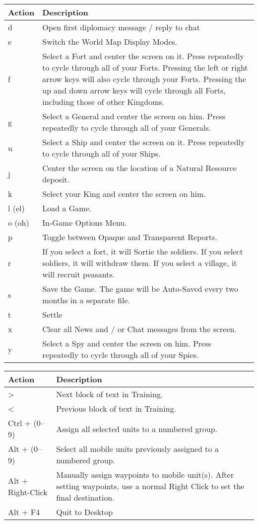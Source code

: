 \begin{tabular}{ | l | p{10cm} |}
	\hline	 	
	Action	& Description \\ \hline
	d	& Open first diplomacy message / reply to chat \\ \hline
	e	& Switch the World Map Display Modes. \\ \hline
	f	& Select a Fort and center the screen on it. Press repeatedly to cycle through all of your Forts. Pressing the left or right arrow keys will also cycle through your Forts. Pressing the up and down arrow keys will cycle through all Forts, including those of other Kingdoms. \\ \hline
	g	& Select a General and center the screen on him. Press repeatedly to cycle through all of your Generals. \\ \hline
	u	& Select a Ship and center the screen on it. Press repeatedly to cycle through all of your Ships. \\ \hline
	j	& Center the screen on the location of a Natural Resource deposit. \\ \hline
	k	& Select your King and center the screen on him. \\ \hline
	l (el)	& Load a Game. \\ \hline
	o (oh)	& In-Game Options Menu. \\ \hline
	p	& Toggle between Opaque and Transparent Reports. \\ \hline
	r	& If you select a fort, it will Sortie the soldiers. If you select soldiers, it will withdraw them. If you select a village, it will recruit peasants. \\ \hline
	s	& Save the Game. The game will be Auto-Saved every two months in a separate file. \\ \hline
	t	& Settle \\ \hline
	x	& Clear all News and / or Chat messages from the screen. \\ \hline
	y	& Select a Spy and center the screen on him. Press repeatedly to cycle through all of your Spies. \\ \hline
\end{tabular}
	
	\begin{tabular}{ | l | p{6cm} |}
		\hline	 
		Action	& Description \\ \hline
	>	& Next block of text in Training. \\ \hline
	<	& Previous block of text in Training. \\ \hline
	Ctrl + (0--9)	& Assign all selected units to a numbered group. \\ \hline
	Alt + (0--9)	& Select all mobile units previously assigned to a numbered group. \\ \hline
	Alt + Right-Click	& Manually assign waypoints to mobile unit(s). After setting waypoints, use a normal Right Click to set the final destination. \\ \hline
	Alt + F4	& Quit to Desktop \\ \hline
		\hline
\end{tabular}

